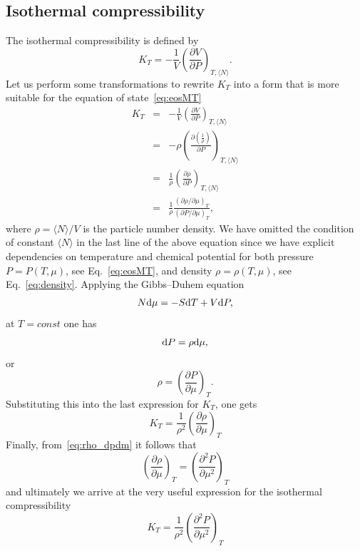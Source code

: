 \documentclass[12pt]{article}
\begin{document}
	\subsection{Isothermal compressibility}
	The isothermal compressibility is defined by
	\begin{equation}
		\label{def:isotherm_compres}
		K_T = -\frac{1}{V}\left(\frac{\partial V}{\partial P}\right)_{T,\langle N\rangle}.
	\end{equation}
	Let us perform some transformations to rewrite $K_T$ into a form that is more suitable for the equation of state~\eqref{eq:eosMT}
	\begin{eqnarray*}
		K_T & = & - \frac{1}{V}\left(\frac{\partial V}{\partial P}\right)_{T,\langle N\rangle}
		\\
		& = & -\rho \left(\frac{\partial \left(\frac{1}{\rho}\right)}{\partial P}\right)_{T,\langle N\rangle}
		\\
		& = & \frac{1}{\rho} \left(\frac{\partial \rho}{\partial P} \right)_{T,\langle N\rangle}
		\\
		& = & \frac{1}{\rho} \frac{\left(\partial \rho / \partial \mu\right)_{T}}
		{\left(\partial P / \partial \mu\right)_{T}},
	\end{eqnarray*}
	where $\rho = \langle N \rangle / V$ is the particle number density. We have omitted the condition of constant $\langle N \rangle$ in the last line of the above equation since we have explicit dependencies on temperature and chemical potential for both pressure $P = P(T, \mu)$, see Eq.~\eqref{eq:eosMT}, and density $\rho = \rho(T, \mu)$, see Eq.~\eqref{eq:density}.
	Applying the Gibbs--Duhem equation
	\begin{equation}
		N{\rm d}\mu = -S{\rm d}T + V{\rm d}P,
	\end{equation}
	at $T = const$ one has 
	\begin{equation*}
		{\rm d} P = \rho {\rm d} \mu,
	\end{equation*}
	or
	\begin{equation}
		\label{eq:rho_dpdm}
		\rho = \left(\frac{\partial P}{\partial \mu}\right)_T.
	\end{equation}
	Substituting this into the last expression for $K_T$, one gets
	\begin{equation}
		K_T = \frac{1}{\rho^2} \left(\frac{\partial \rho}{\partial \mu}\right)_{T}
	\end{equation}
	Finally, from~\eqref{eq:rho_dpdm} it follows that
	\begin{equation}
		\left(\frac{\partial \rho}{\partial \mu}\right)_T = \left(\frac{\partial^2 P}{\partial \mu^2}\right)_T
	\end{equation}
	and ultimately we arrive at the very useful expression for the isothermal compressibility
	\begin{equation}
		K_T = \frac{1}{\rho^2} \left(\frac{\partial^2 P}{\partial \mu^2}\right)_{T}
	\end{equation}
	
\end{document}
